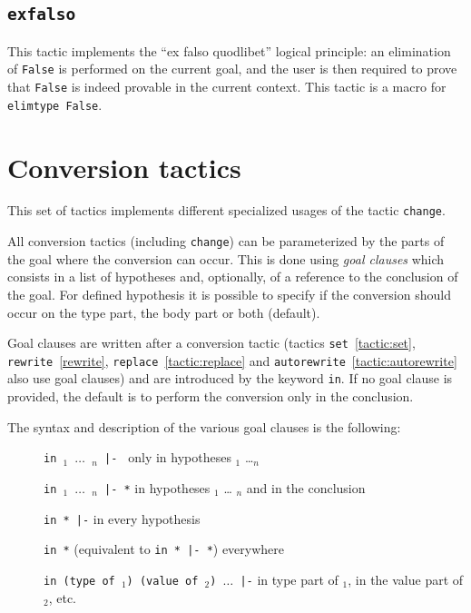 \subsection{\tt exfalso}
\label{exfalso}

This tactic implements the ``ex falso quodlibet'' logical principle:
an elimination of {\tt False} is performed on the current goal, and the
user is then required to prove that {\tt False} is indeed provable in
the current context. This tactic is a macro for {\tt elimtype False}.

\section{Conversion tactics
\label{Conversion-tactics}}

This set of tactics implements different specialized usages of the
tactic \texttt{change}.

All conversion tactics (including \texttt{change}) can be
parameterized by the parts of the goal where the conversion can
occur. This is done using \emph{goal clauses} which consists in a list
of hypotheses and, optionally, of a reference to the conclusion of the
goal. For defined hypothesis it is possible to specify if the
conversion should occur on the type part, the body part or both
(default).

Goal clauses are written after a conversion tactic (tactics
\texttt{set}~\ref{tactic:set},          \texttt{rewrite}~\ref{rewrite},
\texttt{replace}~\ref{tactic:replace}                               and
\texttt{autorewrite}~\ref{tactic:autorewrite} also use goal clauses)  and
are introduced by  the keyword \texttt{in}. If no goal clause is provided,
the default is to perform the conversion only in the conclusion.

The syntax and description of the various goal clauses is the following:
\begin{description}
\item[]\texttt{in {\ident}$_1$ $\ldots$ {\ident}$_n$ |- } only in hypotheses {\ident}$_1$
  \ldots {\ident}$_n$
\item[]\texttt{in {\ident}$_1$ $\ldots$ {\ident}$_n$ |- *} in hypotheses {\ident}$_1$ \ldots
  {\ident}$_n$ and in the conclusion
\item[]\texttt{in * |-} in every hypothesis
\item[]\texttt{in *} (equivalent to \texttt{in * |- *}) everywhere
\item[]\texttt{in (type of {\ident}$_1$) (value of {\ident}$_2$) $\ldots$ |-} in
  type part of {\ident}$_1$, in the value part of {\ident}$_2$, etc. 
\end{description}

